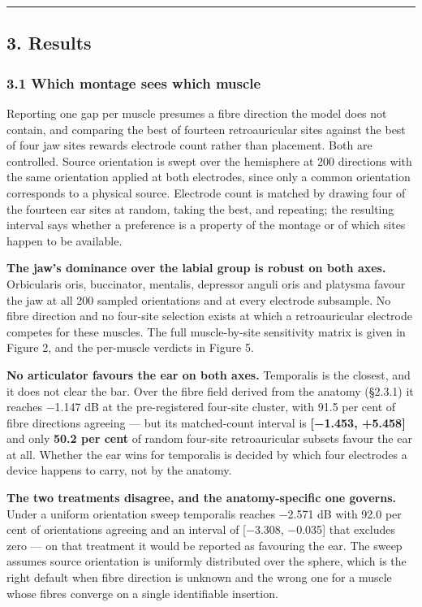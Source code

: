 \documentclass[
  11pt,
]{article}
\begin{document}
\begin{center}\rule{0.5\linewidth}{0.5pt}\end{center}

\subsection{3. Results}\label{results}

\subsubsection{3.1 Which montage sees which muscle}\label{which-montage-sees-which-muscle}

Reporting one gap per muscle presumes a fibre direction the model does not
contain, and comparing the best of fourteen retroauricular sites against the
best of four jaw sites rewards electrode count rather than placement. Both are
controlled. Source orientation is swept over the hemisphere at 200 directions
with the same orientation applied at both electrodes, since only a common
orientation corresponds to a physical source. Electrode count is matched by
drawing four of the fourteen ear sites at random, taking the best, and
repeating; the resulting interval says whether a preference is a property of
the montage or of which sites happen to be available.

\textbf{The jaw's dominance over the labial group is robust on both axes.}
Orbicularis oris, buccinator, mentalis, depressor anguli oris and platysma
favour the jaw at all 200 sampled orientations and at every electrode
subsample. No fibre direction and no four-site selection exists at which a
retroauricular electrode competes for these muscles. The full muscle-by-site
sensitivity matrix is given in Figure 2, and the per-muscle verdicts in
Figure 5.

\textbf{No articulator favours the ear on both axes.} Temporalis is the closest,
and it does not clear the bar. Over the fibre field derived from the anatomy
(§2.3.1) it reaches −1.147 dB at the pre-registered four-site cluster, with
91.5 per cent of fibre directions agreeing --- but its matched-count interval is
\textbf{{[}−1.453, +5.458{]}} and only \textbf{50.2 per cent} of random four-site
retroauricular subsets favour the ear at all. Whether the ear wins for
temporalis is decided by which four electrodes a device happens to carry, not
by the anatomy.

\textbf{The two treatments disagree, and the anatomy-specific one governs.} Under a
uniform orientation sweep temporalis reaches −2.571 dB with 92.0 per cent of
orientations agreeing and an interval of {[}−3.308, −0.035{]} that excludes zero ---
on that treatment it would be reported as favouring the ear. The sweep assumes
source orientation is uniformly distributed over the sphere, which is the right
default when fibre direction is unknown and the wrong one for a muscle whose
fibres converge on a single identifiable insertion.
\end{document}
